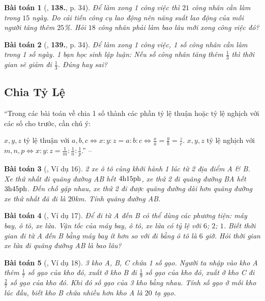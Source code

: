 \documentclass{article}
\newtheorem{baitoan}{Bài toán}
\begin{document}
\begin{baitoan}[\cite{Tuyen_Toan_7}, \textbf{138.}, p. 34]
	Để làm xong 1 công việc thì $21$ công nhân cần làm trong $15$ ngày. Do cải tiến công cụ lao động nên năng suất lao động của mỗi người tăng thêm $25$\%. Hỏi $18$ công nhân phải làm bao lâu mới xong công việc đó?
\end{baitoan}

\begin{baitoan}[\cite{Tuyen_Toan_7}, \textbf{139.}, p. 34]
	Để làm xong 1 công việc, 1 số công nhân cần làm trong 1 số ngày. 1 bạn học sinh lập luận: Nếu số công nhân tăng thêm $\frac{1}{3}$ thì thời gian sẽ giảm đi $\frac{1}{3}$. Đúng hay sai?
\end{baitoan}


\subsection{Chia Tỷ Lệ}
``Trong các bài toán về chia 1 số thành các phần tỷ lệ thuận hoặc tỷ lệ nghịch với các số cho trước, cần chú ý:

	 $x,y,z$ tỷ lệ thuận với $a,b,c\Leftrightarrow x:y:z = a:b:c\Leftrightarrow\frac{x}{a} = \frac{y}{b} = \frac{z}{c}$.
	 $x,y,z$ tỷ lệ nghịch với $m,n,p\Leftrightarrow x:y:z = \frac{1}{m}:\frac{1}{n}:\frac{1}{p}$.'' -- \cite{Binh_Toan_7_tap_1}


\begin{baitoan}[\cite{Binh_Toan_7_tap_1}, Ví dụ 16]
	2 xe ô tô cùng khởi hành 1 lúc từ 2 địa điểm A \& B. Xe thứ nhất đi quãng đường AB hết $\rm4h15ph$, xe thứ 2 đi quãng đường BA hết $\rm3h45ph$. Đến chỗ gặp nhau, xe thứ 2 đi được quãng đường dài hơn quãng đường xe thứ nhất đã đi là $20$\emph{km}. Tính quãng đường AB.
\end{baitoan}

\begin{baitoan}[\cite{Binh_Toan_7_tap_1}, Ví dụ 17]
	Để đi từ A đến B có thể dùng các phương tiện: máy bay, ô tô, xe lửa. Vận tốc của máy bay, ô tô, xe lửa có tỷ lệ với $6$; $2$; $1$. Biết thời gian đi từ A đến B bằng máy bay ít hơn so với đi bằng ô tô là $6$ giờ. Hỏi thời gian xe lửa đi quãng đường AB là bao lâu?
\end{baitoan}

\begin{baitoan}[\cite{Binh_Toan_7_tap_1}, Ví dụ 18]
	3 kho A, B, C chứa 1 số gạo. Người ta nhập vào kho A thêm $\frac{1}{7}$ số gạo của kho đó, xuất ở kho B đi $\frac{1}{9}$ số gạo của kho đó, xuất ở kho C đi $\frac{2}{7}$ số gạo của kho đó. Khi đó số gạo của 3 kho bằng nhau. Tính số gạo ở mỗi kho lúc đầu, biết kho B chứa nhiều hơn kho A là $20$ tạ gạo.
\end{baitoan}
\end{document}
